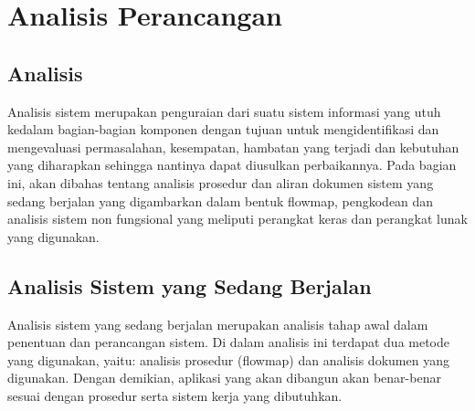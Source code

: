 \section{Analisis Perancangan}
\subsection{Analisis}
Analisis sistem merupakan penguraian dari suatu sistem informasi yang utuh kedalam bagian-bagian komponen dengan tujuan untuk mengidentifikasi dan mengevaluasi permasalahan, kesempatan, hambatan yang terjadi dan kebutuhan yang diharapkan sehingga nantinya dapat diusulkan perbaikannya. Pada bagian ini, akan dibahas tentang analisis prosedur dan aliran dokumen sistem yang sedang berjalan yang digambarkan dalam bentuk flowmap, pengkodean dan analisis sistem non fungsional yang meliputi perangkat keras dan perangkat lunak yang digunakan.
\subsection{Analisis Sistem yang Sedang Berjalan}
Analisis sistem yang sedang berjalan merupakan analisis tahap awal dalam penentuan dan perancangan sistem. Di dalam analisis ini terdapat dua metode yang digunakan, yaitu: analisis prosedur (flowmap) dan analisis dokumen yang digunakan. Dengan demikian, aplikasi yang akan dibangun akan benar-benar sesuai dengan prosedur serta sistem kerja yang dibutuhkan.

